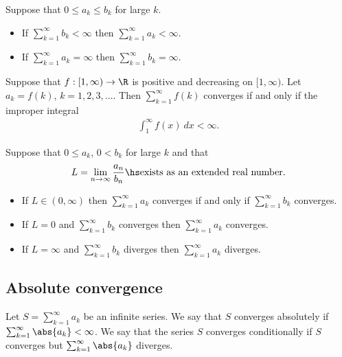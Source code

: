 \documentclass{article}
\begin{document}
\begin{theorem}
    Suppose that $0\leq a_k\leq b_k$ for large $k$.
    \begin{itemize}
        \item If $\sum_{k=1}^\infty b_k<\infty$ then $\sum_{k=1}^\infty a_k < \infty$.
        \item If $\sum_{k=1}^\infty a_k = \infty$ then $\sum_{k=1}^\infty b_k = \infty$.
    \end{itemize}
\end{theorem}

\begin{theorem}
    Suppose that $f:[1,\infty)\to\R$ is positive and decreasing on
    $[1,\infty)$. Let $a_k=f(k)$, $k=1,2,3,...$. Then $\sum_{k=1}^\infty f(k)$
    converges if and only if the improper integral
    \begin{align*}
        \int_1^\infty f(x)\:dx < \infty.
    \end{align*}
\end{theorem}

\setcounter{theorem}{6}
\begin{theorem}
    Suppose that $0\leq a_k$, $0<b_k$ for large $k$ and that
    \begin{align*}
        L=\lim_{n\to\infty}\frac{a_n}{b_n}\hs\text{exists as an extended real number}.
    \end{align*}
    \begin{itemize}
        \item If $L\in(0,\infty)$ then $\sum_{k=1}^\infty a_k$ converges if and only if $\sum_{k=1}^\infty b_k$ converges.
        \item If $L=0$ and $\sum_{k=1}^\infty b_k$ converges then $\sum_{k=1}^\infty a_k$ converges.
        \item If $L=\infty$ and $\sum_{k=1}^\infty b_k$ diverges then $\sum_{k=1}^\infty a_k$ diverges.
    \end{itemize}
\end{theorem}

\subsection{Absolute convergence}

\begin{definition}
    Let $S=\sum_{k=1}^\infty a_k$ be an infinite series. We say that $S$ converges
    absolutely if $\sum_{k=1}^\infty \abs{a_k}<\infty$. We say that the series
    $S$ converges conditionally if $S$ converges but $\sum_{k=1}^\infty\abs{a_k}$
    diverges.
\end{definition}
\end{document}

